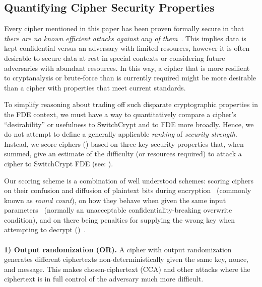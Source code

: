 \subsection{Quantifying Cipher Security Properties} \label{subsec:quantify}

Every cipher mentioned in this paper has been proven formally secure in that
\emph{there are no known efficient attacks against any of them}~\cite{All,
Ciphers, Again}. This implies data is kept confidential versus an adversary with
limited resources, however it is often desirable to secure data at rest in
special contexts or considering future adversaries with abundant resources. In
this way, a cipher that is more resilient to cryptanalysis or brute-force than
is currently required might be more desirable than a cipher with properties that
meet current standards.

To simplify reasoning about trading off such disparate cryptographic properties
in the FDE context, we must have a way to quantitatively compare a cipher's
``desirability'' or usefulness to SwitchCrypt and to FDE more broadly. Hence, we
do not attempt to define a generally applicable \textit{ranking} of
\emph{security strength}. Instead, we score ciphers () based on three key security properties that, when summed, give an
estimate of the difficulty (or resources required) to attack a cipher to SwitchCrypt FDE (see:
). 

Our scoring scheme is a combination of well understood schemes: scoring ciphers
on their confusion and diffusion of plaintext bits during
encryption~\cite{MicrosoftCryptanalysisAES,SchneiersOnRounds} (commonly known as
\emph{round count}), on how they behave when given the same input
parameters~\cite{random-output1,Freestyle,random-output2} (normally an
unacceptable confidentiality-breaking overwrite condition), and on there being
penalties for supplying the wrong key when attempting to decrypt ()~\cite{scrypt,Freestyle,others2}.\\
\\
\textbf{1) Output randomization (OR).} A cipher with output randomization
generates different ciphertexts non-deterministically given the same key, nonce,
and message. This makes chosen-ciphertext (CCA) and other attacks where the
ciphertext is in full control of the adversary much more difficult.

